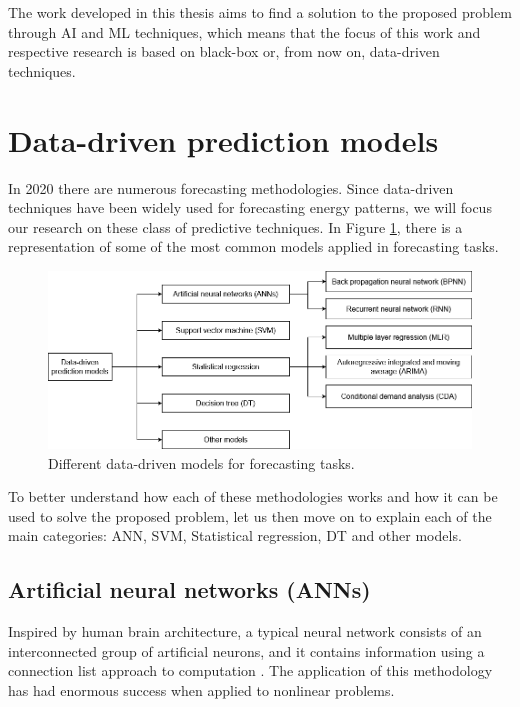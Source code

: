 The work developed in this thesis aims to find a solution to the proposed problem through \ac{AI} and \ac{ML} techniques, which means that the focus of this work and respective research is based on black-box or, from now on, data-driven techniques.

\section{Data-driven prediction models\label{b}}

In 2020 there are numerous forecasting methodologies. Since data-driven techniques have been widely used for forecasting energy patterns, we will focus our research on these class of predictive techniques. In Figure \ref{datamodels}, there is a representation of some of the most common models applied in forecasting tasks.

\begin{figure}[h!]
    \centering
    \begin{center}
    \includegraphics[width=1\textwidth]{Images/data-drive prediction models.png}
    \caption{Different data-driven models for forecasting tasks.}
    \label{datamodels}
    \end{center}
\end{figure}

To better understand how each of these methodologies works and how it can be used to solve the proposed problem, let us then move on to explain each of the main categories: \ac{ANN}, \ac{SVM}, Statistical regression, \ac{DT} and other models.


\subsection{Artificial neural networks (ANNs)}

Inspired by human brain architecture, a typical neural network consists of an interconnected group of artificial neurons, and it contains information using a connection list approach to computation \cite{ann1}. The application of this methodology has had enormous success when applied to nonlinear problems.

